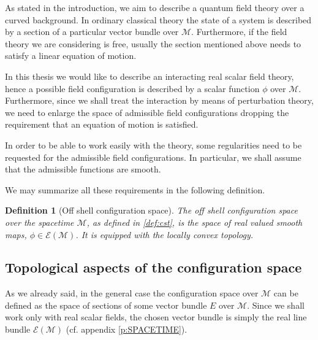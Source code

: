 \documentclass[11pt]{book}
\newcommand{\Ecal}{\mathcal{E}}
\newcommand{\Mcal}{\mathcal{M}}
\theoremstyle{break}
\newtheorem{definition}{Definition}[chapter]
\begin{document}
As stated in the introduction, we aim to describe a quantum field theory over a curved background. In ordinary classical theory the state of a system is described by a section of a particular vector bundle over $\Mcal$. Furthermore, if the field theory we are considering is free, usually the section mentioned above needs to satisfy a linear equation of motion.


In this thesis we would like to describe an interacting real scalar field theory, hence a possible field configuration is described by a scalar function $\phi$ over $\Mcal$. Furthermore, since we shall treat the interaction by means of perturbation theory, we need to enlarge the space of admissible field configurations dropping the requirement that an equation of motion is satisfied.


In order to be able to work easily with the theory, some regularities need to be requested for the admissible field configurations. In particular, we shall assume that the admissible functions are smooth.   


We may summarize all these requirements in the following definition.


\begin{definition}[Off shell configuration space]\label{def:config_space}
The off shell configuration space over the spacetime $\Mcal$, as defined in \ref{def:cst}, is the space of real valued smooth maps, $\phi \in \Ecal(\Mcal)$. It is equipped with the locally convex topology.
\end{definition}


\subsection{Topological aspects of the configuration space}
\label{p:TOPO_CONFIG_SPACE}


As we already said, in the general case the configuration space over $\Mcal$ can be defined as the space of sections of some vector bundle $E$ over $\Mcal$. Since we shall work only with real scalar fields, the chosen vector bundle is simply the real line bundle $\Ecal(\Mcal)$ (cf. appendix \ref{p:SPACETIME}).
\end{document}
